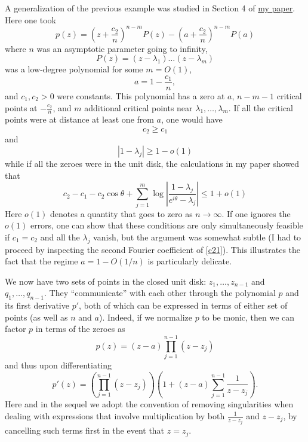 \documentclass[12pt]{article}
\begin{document}
\begin{example}\label{ex2}  A generalization of the previous example was studied in Section 4 of \href{???}{my paper}.  Here one took
    $$ p(z) = (z + \frac{c_2}{n})^{n-m} P(z) - (a + \frac{c_2}{n})^{n-m} P(a)$$
where $n$ was an asymptotic parameter going to infinity,
$$ P(z) = (z-\lambda_1) \dots (z - \lambda_m)$$
was a low-degree polynomial for some $m=O(1)$,
$$ a = 1 - \frac{c_1}{n},$$
and $c_1,c_2 > 0$ were constants.  This polynomial has a zero at $a$, $n-m-1$ critical points at $-\frac{c_2}{n}$, and $m$ additional critical points near $\lambda_1,\dots,\lambda_m$.  If all the critical points were at distance at least one from $a$, one would have
$$ c_2 \geq c_1$$
and
$$ |1-\lambda_j| \geq 1 - o(1)$$
while if all the zeroes were in the unit disk, the calculations in my paper showed that
\begin{equation}\label{c21} c_2 - c_1 - c_2 \cos \theta + \sum_{j=1}^m \log |\frac{1-\lambda_j}{e^{i\theta}-\lambda_j}| \leq 1 + o(1)
\end{equation}
Here $o(1)$ denotes a quantity that goes to zero as $n \to \infty$.  If one ignores the $o(1)$ errors, one can show that these conditions are only simultaneously feasible if $c_1=c_2$ and all the $\lambda_j$ vanish, but the argument was somewhat subtle (I had to proceed by inspecting the second Fourier coefficient of \eqref{c21}).  This illustrates the fact that the regime $a = 1 - O(1/n)$ is particularly delicate.
\end{example}

We now have two sets of points in the closed unit disk: $z_1,\dots,z_{n-1}$ and $q_1,\dots,q_{n-1}$.  They ``communicate'' with each other through the polynomial $p$ and its first derivative $p'$, both of which can be expressed in terms of either set of points (as well as $n$ and $a$).  Indeed, if we normalize $p$ to be monic, then we can factor $p$ in terms of the zeroes as
\begin{equation}\label{p-eq-zero}
    p(z) = (z-a) \prod_{j=1}^{n-1} (z-z_j)
\end{equation}
and thus upon differentiating
\begin{equation}\label{p-deriv-zero}
    p'(z) = (\prod_{j=1}^{n-1} (z-z_j)) (1 + (z-a) \sum_{j=1}^{n-1} \frac{1}{z-z_j}).
\end{equation}
Here and in the sequel we adopt the convention of removing singularities when dealing with expressions that involve multiplication by both $\frac{1}{z-z_j}$ and $z-z_j$, by cancelling such terms first in the event that $z=z_j$.
\end{document}
